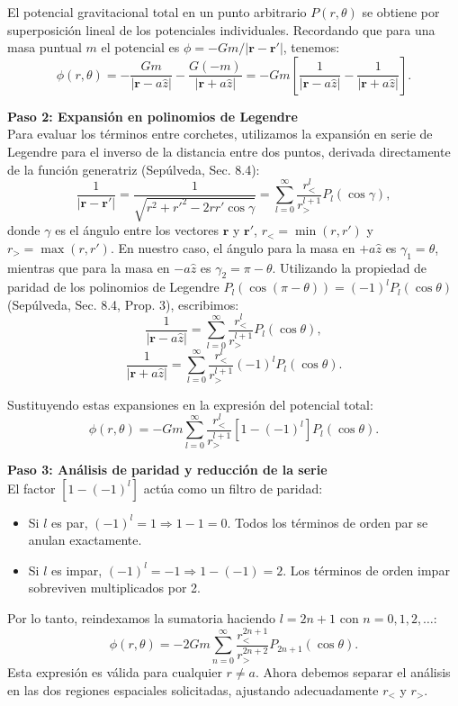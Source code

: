 \documentclass[a4paper]{article}
\begin{document}
El potencial gravitacional total en un punto arbitrario $P(r, \theta)$ se obtiene por superposición lineal de los potenciales individuales. Recordando que para una masa puntual $m$ el potencial es $\phi = -Gm/|\mathbf{r} - \mathbf{r}'|$, tenemos:
$$
\phi(r, \theta) = -\frac{Gm}{|\mathbf{r} - a\hat{z}|} - \frac{G(-m)}{|\mathbf{r} + a\hat{z}|} = -Gm \left[ \frac{1}{|\mathbf{r} - a\hat{z}|} - \frac{1}{|\mathbf{r} + a\hat{z}|} \right].
$$

\vspace{0.3cm}
\noindent\textbf{Paso 2: Expansión en polinomios de Legendre}\\
Para evaluar los términos entre corchetes, utilizamos la expansión en serie de Legendre para el inverso de la distancia entre dos puntos, derivada directamente de la función generatriz (Sepúlveda, Sec. 8.4):
$$
\frac{1}{|\mathbf{r} - \mathbf{r}'|} = \frac{1}{\sqrt{r^2 + r'^2 - 2rr'\cos\gamma}} = \sum_{l=0}^{\infty} \frac{r_<^l}{r_>^{l+1}} P_l(\cos\gamma),
$$
donde $\gamma$ es el ángulo entre los vectores $\mathbf{r}$ y $\mathbf{r}'$, $r_< = \min(r, r')$ y $r_> = \max(r, r')$. En nuestro caso, el ángulo para la masa en $+a\hat{z}$ es $\gamma_1 = \theta$, mientras que para la masa en $-a\hat{z}$ es $\gamma_2 = \pi - \theta$. Utilizando la propiedad de paridad de los polinomios de Legendre $P_l(\cos(\pi-\theta)) = (-1)^l P_l(\cos\theta)$ (Sepúlveda, Sec. 8.4, Prop. 3), escribimos:
$$
\frac{1}{|\mathbf{r} - a\hat{z}|} = \sum_{l=0}^{\infty} \frac{r_<^l}{r_>^{l+1}} P_l(\cos\theta),
$$
$$
\frac{1}{|\mathbf{r} + a\hat{z}|} = \sum_{l=0}^{\infty} \frac{r_<^l}{r_>^{l+1}} (-1)^l P_l(\cos\theta).
$$

Sustituyendo estas expansiones en la expresión del potencial total:
$$
\phi(r, \theta) = -Gm \sum_{l=0}^{\infty} \frac{r_<^l}{r_>^{l+1}} \left[ 1 - (-1)^l \right] P_l(\cos\theta).
$$

\vspace{0.3cm}
\noindent\textbf{Paso 3: Análisis de paridad y reducción de la serie}\\
El factor $[1 - (-1)^l]$ actúa como un filtro de paridad:
\begin{itemize}
    \item Si $l$ es par, $(-1)^l = 1 \Rightarrow 1 - 1 = 0$. Todos los términos de orden par se anulan exactamente.
    \item Si $l$ es impar, $(-1)^l = -1 \Rightarrow 1 - (-1) = 2$. Los términos de orden impar sobreviven multiplicados por 2.
\end{itemize}
Por lo tanto, reindexamos la sumatoria haciendo $l = 2n+1$ con $n = 0, 1, 2, \dots$:
$$
\phi(r, \theta) = -2Gm \sum_{n=0}^{\infty} \frac{r_<^{2n+1}}{r_>^{2n+2}} P_{2n+1}(\cos\theta).
$$
Esta expresión es válida para cualquier $r \neq a$. Ahora debemos separar el análisis en las dos regiones espaciales solicitadas, ajustando adecuadamente $r_<$ y $r_>$.
\end{document}

